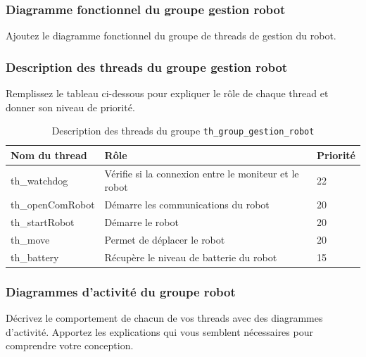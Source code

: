 \documentclass[11pt, a4paper]{paper}
\begin{document}
\subsubsection{Diagramme fonctionnel du groupe gestion robot}
{\color{blue} Ajoutez le diagramme fonctionnel du groupe de threads de gestion du robot.}

\subsubsection{Description des threads du groupe gestion robot}
{\color{red} Remplissez le tableau ci-dessous pour expliquer le rôle de chaque thread et donner son niveau de priorité.}


\begin{table}[htp]
\caption{Description des threads du groupe {\tt th\_group\_gestion\_robot}}
\begin{center}
\begin{tabular}{|p{3cm}|p{8.5cm}|p{2cm}|}
\hline
\bf Nom du thread &	\bf Rôle &	\bf Priorité \\
\hline
\hline
\color{blue}th\_watchdog	& \color{blue}Vérifie si la connexion entre le moniteur et le robot & \color{blue}22\\
\hline
\color{blue}th\_openComRobot	& \color{blue}Démarre les communications du robot & \color{blue}20\\
\hline
\color{blue}th\_startRobot	& \color{blue}Démarre le robot & \color{blue}20\\
\hline
\color{blue}th\_move	& \color{blue}Permet de déplacer le robot & \color{blue}20\\
\hline
\color{blue}th\_battery	& \color{blue}Récupère le niveau de batterie du robot & \color{blue}15\\
\hline
\end{tabular}
\end{center}
\label{tab:gt_moniteur}
\end{table}%
\FloatBarrier

\subsubsection{Diagrammes d'activité du groupe robot}
{\color{blue}Décrivez le comportement de chacun de vos threads avec des diagrammes d'activité. Apportez les explications qui vous semblent nécessaires pour comprendre votre conception.}


\end{document}
